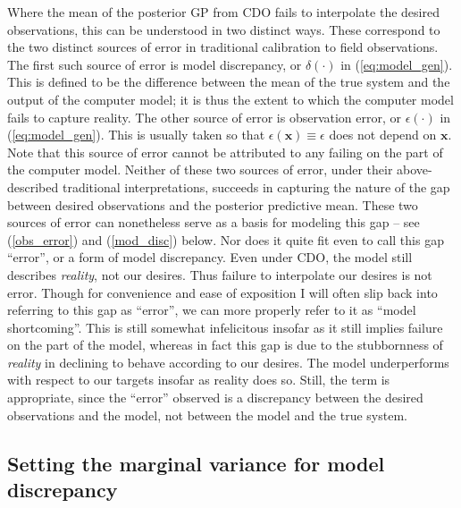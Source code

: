 \documentclass{article}
\begin{document}
Where the mean of the posterior GP from CDO fails to interpolate the desired observations, this can be understood in two distinct ways. 
These correspond to the two distinct sources of error in traditional calibration to field observations. 
The first such source of error is model discrepancy, or $\delta(\cdot)$ in (\ref{eq:model_gen}). 
This is defined to be the difference between the mean of the true system and the output of the computer model; it is thus the extent to which the computer model fails to capture reality. 
The other source of error is observation error, or $\epsilon(\cdot)$ in (\ref{eq:model_gen}). 
This is usually taken so that $\epsilon(\mathbf x) \equiv \epsilon$ does not depend on $\mathbf x$. 
Note that this source of error cannot be attributed to any failing on the part of the computer model. 
Neither of these two sources of error, under their above-described traditional interpretations, succeeds in capturing the nature of the gap between desired observations and the posterior predictive mean. 
These two sources of error can nonetheless serve as a basis for modeling this gap -- see (\ref{obs_error}) and (\ref{mod_disc}) below.
Nor does it quite fit even to call this gap ``error'', or a form of model discrepancy. 
Even under CDO, the model still describes \emph{reality}, not our desires. 
Thus failure to interpolate our desires is not error. 
Though for convenience and ease of exposition I will often slip back into referring to this gap as ``error'', we can more properly refer to it as ``model shortcoming''. 
This is still somewhat infelicitous insofar as it still implies failure on the part of the model, whereas in fact this gap is due to the stubbornness of \emph{reality} in declining to behave according to our desires. 
The model underperforms with respect to our targets insofar as reality does so. 
Still, the term is appropriate, since the ``error'' observed is a discrepancy between the desired observations and the model, not between the model and the true system.

\subsection{Setting the marginal variance for model discrepancy}
\end{document}
